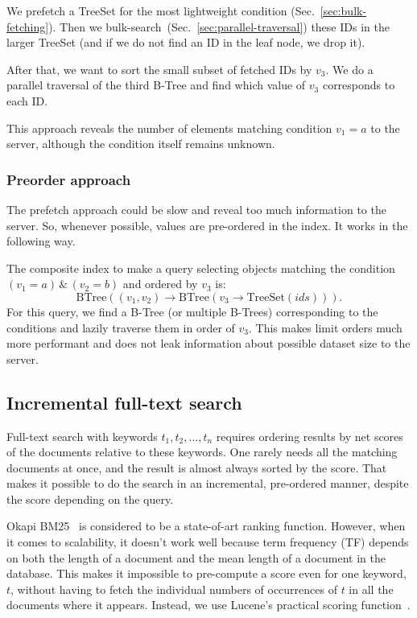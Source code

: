 \documentclass[notitlepage,longbibliography]{revtex4-1}
\begin{document}
We prefetch a TreeSet for the most lightweight condition (Sec.~\ref{sec:bulk-fetching}).
Then we bulk-search~(Sec.~\ref{sec:parallel-traversal}) these IDs in the larger TreeSet (and if we do not find an ID in the leaf node, we drop it).

After that, we want to sort the small subset of fetched IDs by $v_3$.
We do a parallel traversal of the third B-Tree and find which value of $v_3$ corresponds to each ID.

This approach reveals the number of elements matching condition $v_1=a$ to the server, although the condition itself remains unknown.

\subsubsection{Preorder approach}

The prefetch approach could be slow and reveal too much information to the server.
So, whenever possible, values are pre-ordered in the index.
It works in the following way.

The composite index to make a query selecting objects matching the condition $(v_1 = a) \,\&\, (v_2 = b)$ and ordered by $v_3$ is:
\begin{equation*}
    \mbox{BTree}((v_1, v_2) \rightarrow \mbox{BTree}(v_3 \rightarrow \mbox{TreeSet}(ids))).
\end{equation*}
For this query, we find a B-Tree (or multiple B-Trees) corresponding to the conditions and lazily traverse them in order of $v_3$.
This makes limit orders much more performant and does not leak information about possible dataset size to the server.

\subsection{Incremental full-text search}
\label{sec:fulltext}

Full-text search with keywords $t_1, t_2,\ldots, t_n$ requires ordering results by net scores of the documents relative to these keywords.
One rarely needs all the matching documents at once, and the result is almost always sorted by the score.
That makes it possible to do the search in an incremental, pre-ordered manner, despite the score depending on the query.

Okapi BM25~\cite{wiki:OkapiBM25} is considered to be a state-of-art ranking function.
However, when it comes to scalability, it doesn't work well because term frequency (TF) depends on both the length of a document
and the mean length of a document in the database.
This makes it impossible to pre-compute a score even for one keyword, $t$, without having to fetch the individual numbers of occurrences of $t$
in all the documents where it appears.
Instead, we use Lucene's practical scoring function~\cite{lucene-practical-scoring}.
\end{document}
